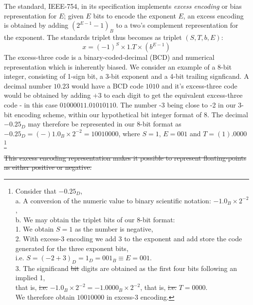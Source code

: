 \documentclass[7pt]{article}
\begin{document}
The standard, IEEE-754, in its specification implements \textit{excess encoding} or bias representation for $E$;  given $E$ bits to encode the exponent $E$, an excess encoding is obtained by adding $(2^{E-1} - 1)_B$ to a two's complement representation for the exponent. The standards triplet thus becomes as triplet $(S, T, b, E)$:
\begin{equation}
x = (-1)^{S}\times 1 . T \times (b^{E-1})
\end{equation}
The excess-three code is a binary-coded-decimal (BCD) and numerical representation which is inherently biased. We consider an example of a 8-bit integer, consisting of 1-sign bit, a 3-bit exponent and a 4-bit trailing signficand. A decimal number $10.23$ would have a BCD code $1010$ and it's excess-three code would be obtained by adding $+3$ to each digit to get the equivalent excess-three code - in this case $0100 0011.0101 0110$. The number -3 being close to -2 in our 3-bit encoding scheme, within our hypothetical bit integer format of 8. The decimal $-0.25_D$ may therefore be represented in our 8-bit format as $-0.25_D = (-)1.0_B \times 2^{-2} = 1 001 0000 $, where $S=1$, $E = 001$ and $T = (1).0000$
\footnote{
Consider that $-0.25_D$, \\ a.  A conversion of the numeric value to binary scientific notation: $ -1.0_B \times 2^{-2}$, \\
b. We may obtain the triplet bits of our 8-bit format: \\
     	1. We obtain $S = 1$ as the number is negative, \\
      2. With excess-3 encoding we add 3 to the exponent and add store the code generated for the three exponent bits, \\
      i.e. $S = (-2 + 3)_{D} = 1_{D} = 001_{B} \equiv E = 001$. \\
      3. The significand \st{bit} digits are obtained as the first four bits following an implied 1, \\
     that is,  \st{i.e.} $-1.0_B \times 2^{-2} = -1.0000_B \times 2^{-2}$, that is, \st{i.e.} $T = 0000$. \\
We therefore obtain $1 001 0000$ in excess-3 encoding. 
}

\st{This excess encoding representation makes it possible to represent floating-points as either positive or negative.}
\end{document}
